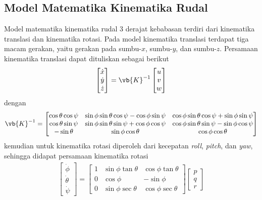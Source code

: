 \subsection{Model Matematika Kinematika Rudal}

Model matematika kinematika rudal 3 derajat kebabasan terdiri dari kinematika translasi dan kinematika rotasi. Pada model kinematika translasi terdapat tiga macam gerakan, yaitu gerakan pada sumbu-$x$, sumbu-$y$, dan sumbu-$z$. Persamaan kinematika translasi dapat dituliskan sebagai berikut
\begin{align}
    \begin{bmatrix}
        \dot{x} \\
        \dot{y} \\
        \dot{z}
    \end{bmatrix} = \vb{K}^{-1}  
    \begin{bmatrix}
        u \\ v \\ w
    \end{bmatrix}
\end{align}
dengan
\begin{align*}
    \vb{K}^{-1} = \begin{bmatrix}
        \cos\theta\cos\psi & \sin\phi\sin\theta\cos\psi-\cos\phi\sin\psi & \cos\phi\sin\theta\cos\psi+\sin\phi\sin\psi \\
        \cos\theta\sin\psi & \sin\phi\sin\theta\sin\psi+\cos\phi\cos\psi & \cos\phi\sin\theta\sin\psi-\sin\phi\cos\psi \\
        -\sin\theta & \sin\phi\cos\theta & \cos\phi\cos\theta 
    \end{bmatrix}
\end{align*}
kemudian untuk kinematika rotasi diperoleh dari kecepatan \textit{roll}, \textit{pitch}, dan \textit{yaw}, sehingga didapat persamaan kinematika rotasi 
\begin{align}
    \begin{bmatrix}
        \dot{\phi} \\
        \dot{\theta} \\
        \dot{\psi}
    \end{bmatrix} = \begin{bmatrix}
        1 & \sin\phi\tan\theta & \cos\phi\tan\theta \\
        0 & \cos\phi & -\sin\phi \\
        0 & \sin\phi\sec\theta & \cos\phi\sec\theta
    \end{bmatrix} \begin{bmatrix}
        p \\ q \\ r
    \end{bmatrix}
\end{align}

